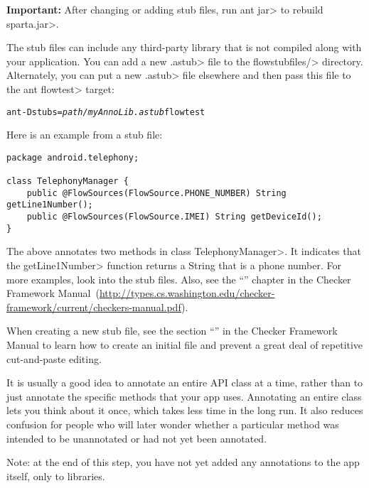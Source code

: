 \noindent
\textbf{Important:}
After changing or adding stub files, run \<ant jar> to rebuild \<sparta.jar>.



The stub files can include any third-party library that is not compiled
along with your application.  You can add a new \<.astub> file to the
\<flowstubfiles/> directory.
Alternately, you can put a new \<.astub> file elsewhere and then pass this
file to the \<ant flowtest> target:

\begin{alltt}
ant -Dstubs=\emph{path/myAnnoLib.astub} flowtest
\end{alltt}

Here is an example from a stub file:

\begin{Verbatim}
package android.telephony;

class TelephonyManager {
    public @FlowSources(FlowSource.PHONE_NUMBER) String getLine1Number();
    public @FlowSources(FlowSource.IMEI) String getDeviceId();
}
\end{Verbatim}

\noindent
The above annotates two methods in class \<TelephonyManager>.
It indicates that the \<getLine1Number> function returns a String that is a
phone number.  For more examples, look into the stub files. Also, see 
the
``'' chapter in the Checker Framework Manual\ifhevea\else\ (\url{http://types.cs.washington.edu/checker-framework/current/checkers-manual.pdf})\fi.


When creating a new stub file, see the section
``'' in the Checker Framework Manual to learn how to create an
initial file and prevent a great deal of repetitive cut-and-paste editing.


It is usually a good idea to annotate an entire API class at a time, rather
than to just annotate the specific methods that your app uses.  Annotating
an entire class lets you think about it once, which takes less time in the
long run.  It also reduces confusion for people who will later wonder
whether a particular method was intended to be unannotated or had not yet
been annotated.


Note: at the end of this step, you have not yet added any annotations to
the app itself, only to libraries.


